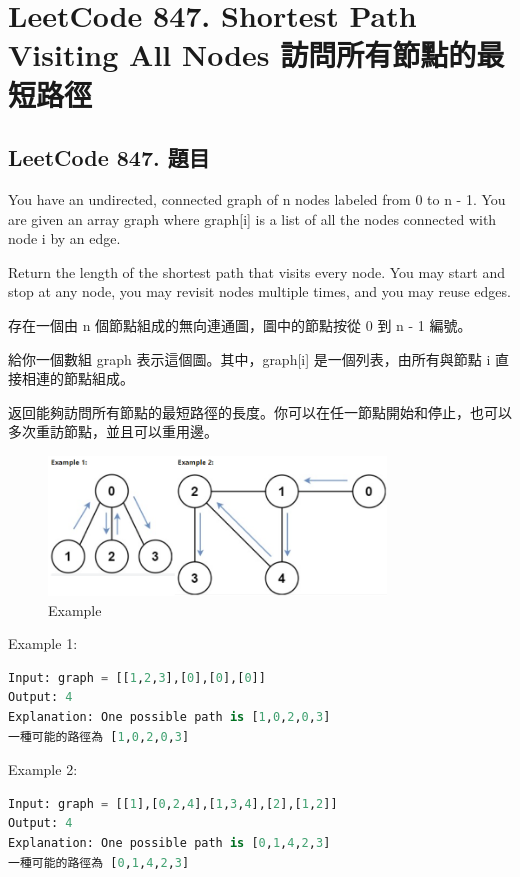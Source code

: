 \documentclass[10pt,UTF8]{ctexart}
\begin{document}
\newpage

\section{LeetCode 847. Shortest Path Visiting All Nodes 訪問所有節點的最短路徑}

\subsection{LeetCode 847. 題目}

You have an undirected, connected graph of n nodes labeled from 0 to n - 1. You are given an array graph where graph[i] is a list of all the nodes connected with node i by an edge.

Return the length of the shortest path that visits every node. You may start and stop at any node, you may revisit nodes multiple times, and you may reuse edges.

存在一個由 n 個節點組成的無向連通圖，圖中的節點按從 0 到 n - 1 編號。

給你一個數組 graph 表示這個圖。其中，graph[i] 是一個列表，由所有與節點 i 直接相連的節點組成。

返回能夠訪問所有節點的最短路徑的長度。你可以在任一節點開始和停止，也可以多次重訪節點，並且可以重用邊。

\begin{figure}[H]
\centering 
\includegraphics[width=0.80\textwidth]{lc-847-p-example.png} 
\caption{Example}
\label{Test}
\end{figure}

Example 1:

\begin{lstlisting}[language={python}]
Input: graph = [[1,2,3],[0],[0],[0]]
Output: 4
Explanation: One possible path is [1,0,2,0,3]
一種可能的路徑為 [1,0,2,0,3]
\end{lstlisting}

Example 2:

\begin{lstlisting}[language={python}]
Input: graph = [[1],[0,2,4],[1,3,4],[2],[1,2]]
Output: 4
Explanation: One possible path is [0,1,4,2,3]
一種可能的路徑為 [0,1,4,2,3]
\end{lstlisting}
\end{document}
